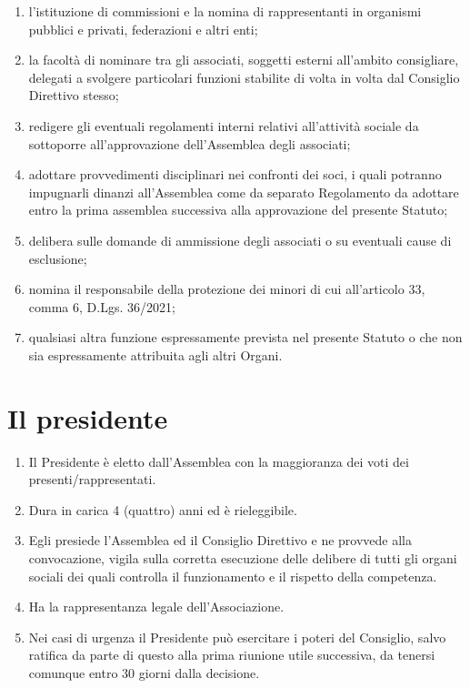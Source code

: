 \documentclass{djtsasddoc}
\begin{document}
\begin{enumerate}
\begin{enumerate}
			\item l'istituzione di commissioni e la nomina di rappresentanti in organismi pubblici e privati, federazioni e altri enti;
			\item la facoltà di nominare tra gli associati, soggetti esterni all'ambito consigliare, delegati a svolgere particolari funzioni stabilite di volta in volta dal Consiglio Direttivo stesso;
			\item redigere gli eventuali regolamenti interni relativi all'attività sociale da sottoporre all'approvazione dell'Assemblea degli associati;
			\item adottare provvedimenti disciplinari nei confronti dei soci, i quali potranno impugnarli dinanzi all'Assemblea come da separato Regolamento da  adottare  entro la prima assemblea successiva alla approvazione del presente Statuto;
			\item delibera sulle domande di ammissione degli associati o su eventuali cause di esclusione;
			\item nomina il responsabile della protezione dei minori di cui all'articolo 33, comma 6, D.Lgs. 36/2021;
			\item qualsiasi altra funzione espressamente prevista nel presente Statuto o che non sia espressamente attribuita agli altri Organi.
		\end{enumerate}
	\end{enumerate}
	
	\section{Il presidente}
	\begin{enumerate}
		\item Il Presidente è eletto dall'Assemblea con la maggioranza dei voti dei presenti/rappresentati.
		\item Dura in carica 4 (quattro) anni ed è rieleggibile.
		\item Egli presiede l'Assemblea ed il Consiglio Direttivo e ne provvede alla convocazione, vigila sulla corretta esecuzione delle delibere di tutti gli organi sociali dei quali controlla il funzionamento e il rispetto della competenza.
		\item Ha la rappresentanza legale dell'Associazione.
		\item Nei casi di urgenza il Presidente può esercitare i poteri del Consiglio, salvo ratifica da parte di questo alla prima riunione utile successiva, da tenersi comunque entro 30 giorni dalla decisione.
	\end{enumerate}
	
\end{document}
